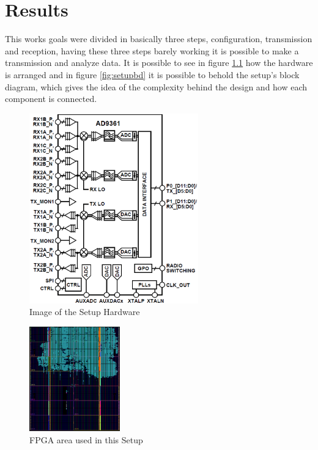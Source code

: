 \chapter{Results}
\label{chap:results}

This works goals were divided in basically three steps, configuration, transmission
and reception, having these three steps barely working it is possible to make a
transmission and analyze data. It is possible to see in figure \ref{fig:setup}
how the hardware is arranged and in figure \ref{fig:setupbd} it is possible to
behold the setup's block diagram, which gives the idea of the complexity behind
the design and how each component is connected.

\begin{figure}[htbp]
    \centering
    \includegraphics[width=0.65\textwidth]{./figures/ad9361_functional_diagram}
    \caption{ Image of the Setup Hardware
    \label{fig:setup}}
\end{figure}

\begin{figure}[htbp]
    \centering
    \includegraphics[width=0.35\textwidth]{./figures/fpga_area}
    \caption{ FPGA area used in this Setup
    \label{fig:fpgaarea}}
\end{figure}

